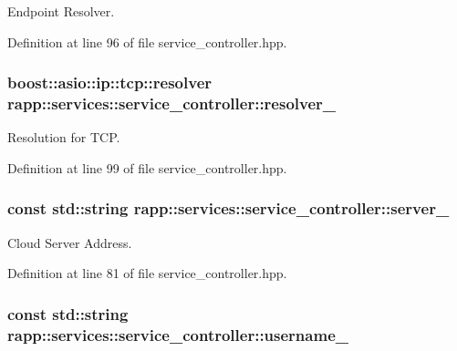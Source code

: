 Endpoint Resolver. 



Definition at line 96 of file service\-\_\-controller.\-hpp.

\hypertarget{classrapp_1_1services_1_1service__controller_a79b1ff3db2397d6a47a20e4b50c3dcef}{
\subsubsection[{resolver\-\_\-}]{\setlength{\rightskip}{0pt plus 5cm}boost\-::asio\-::ip\-::tcp\-::resolver rapp\-::services\-::service\-\_\-controller\-::resolver\-\_\-\hspace{0.3cm}{\ttfamily [private]}}}\label{classrapp_1_1services_1_1service__controller_a79b1ff3db2397d6a47a20e4b50c3dcef}


Resolution for T\-C\-P. 



Definition at line 99 of file service\-\_\-controller.\-hpp.

\hypertarget{classrapp_1_1services_1_1service__controller_af66fa6736ac155e664704dc46c2ebc4f}{
\subsubsection[{server\-\_\-}]{\setlength{\rightskip}{0pt plus 5cm}const std\-::string rapp\-::services\-::service\-\_\-controller\-::server\-\_\-\hspace{0.3cm}{\ttfamily [private]}}}\label{classrapp_1_1services_1_1service__controller_af66fa6736ac155e664704dc46c2ebc4f}


Cloud Server Address. 



Definition at line 81 of file service\-\_\-controller.\-hpp.

\hypertarget{classrapp_1_1services_1_1service__controller_ae2ad65d02bb9323d281c898502eec110}{
\subsubsection[{username\-\_\-}]{\setlength{\rightskip}{0pt plus 5cm}const std\-::string rapp\-::services\-::service\-\_\-controller\-::username\-\_\-\hspace{0.3cm}{\ttfamily [private]}}}\label{classrapp_1_1services_1_1service__controller_ae2ad65d02bb9323d281c898502eec110}


